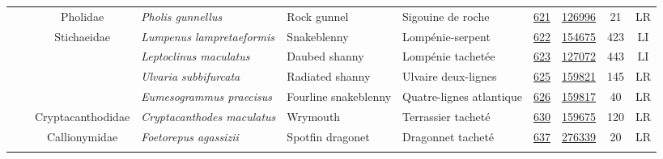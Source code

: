\documentclass[12pt]{article}\usepackage[]{graphicx}\usepackage[]{color}
\begin{document}
\begin{landscape}
\begin{longtable}[t]{ccc>{\centering\arraybackslash}p{3cm}>{\centering\arraybackslash}p{3cm}>{\centering\arraybackslash}p{3cm}>{}c>{}ccc}
\nopagebreak
\hspace{1em}\hspace{1em} &  & Pholidae & \em{Pholis gunnellus} & Rock gunnel & Sigouine de roche & \href{#sec:621}{621} & \href{http://www.marinespecies.org/aphia.php?p=taxdetails&id=126996}{126996} & 21 & LR\\
\nopagebreak
\hspace{1em}\hspace{1em} &  & Stichaeidae & \em{Lumpenus lampretaeformis} & Snakeblenny & Lompénie-serpent & \href{#sec:622}{622} & \href{http://www.marinespecies.org/aphia.php?p=taxdetails&id=154675}{154675} & 423 & LI\\
\nopagebreak
\hspace{1em}\hspace{1em} &  &  & \em{Leptoclinus maculatus} & Daubed shanny & Lompénie tachetée & \href{#sec:623}{623} & \href{http://www.marinespecies.org/aphia.php?p=taxdetails&id=127072}{127072} & 443 & LI\\
\nopagebreak
\hspace{1em}\hspace{1em} &  &  & \em{Ulvaria subbifurcata} & Radiated shanny & Ulvaire deux-lignes & \href{#sec:625}{625} & \href{http://www.marinespecies.org/aphia.php?p=taxdetails&id=159821}{159821} & 145 & LR\\
\nopagebreak
\hspace{1em}\hspace{1em} &  &  & \em{Eumesogrammus praecisus} & Fourline snakeblenny & Quatre-lignes atlantique & \href{#sec:626}{626} & \href{http://www.marinespecies.org/aphia.php?p=taxdetails&id=159817}{159817} & 40 & LR\\
\nopagebreak
\hspace{1em}\hspace{1em} &  & Cryptacanthodidae & \em{Cryptacanthodes maculatus} & Wrymouth & Terrassier tacheté & \href{#sec:630}{630} & \href{http://www.marinespecies.org/aphia.php?p=taxdetails&id=159675}{159675} & 120 & LR\\
\nopagebreak
\hspace{1em}\hspace{1em} &  & Callionymidae & \em{Foetorepus agassizii} & Spotfin dragonet & Dragonnet tacheté & \href{#sec:637}{637} & \href{http://www.marinespecies.org/aphia.php?p=taxdetails&id=276339}{276339} & 20 & LR\\
\nopagebreak

\end{longtable}
\end{landscape}
\end{document}
